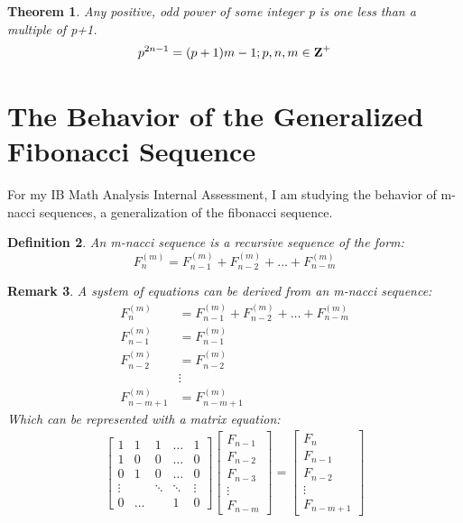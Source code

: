 \documentclass[11pt]{article}
\newtheorem{theorem}{Theorem}[section]
\newtheorem{definition}[theorem]{Definition}
\newtheorem{remark}[theorem]{Remark}
\begin{document}
\begin{theorem}
    Any positive, odd power of some integer \mbox{p} is one less than a multiple of \mbox{p+1}. 
    $$p^{2n-1}=(p+1)m-1;p,n,m\in\mbox{\textbf{Z}}^+$$
\end{theorem}

\section{The Behavior of the Generalized Fibonacci Sequence}

For my IB Math Analysis Internal Assessment, I am studying the behavior of m-nacci sequences, a generalization of the fibonacci sequence.

\begin{definition}
An m-nacci sequence is a recursive sequence of the form:
$$F^{(m)}_n=F^{(m)}_{n-1}+F^{(m)}_{n-2}+\dots+F^{(m)}_{n-m}$$
\end{definition}

\begin{remark}
    A system of equations can be derived from an m-nacci sequence:
    \begin{align*}
        F_n^{(m)} &= F^{(m)}_{n-1}+F^{(m)}_{n-2}+\dots+F^{(m)}_{n-m} \\ 
        F_{n-1}^{(m)} &= F_{n-1}^{(m)} \\ 
        F_{n-2}^{(m)} &= F_{n-2}^{(m)} \\
        &\vdots \\ 
        F_{n-m+1}^{(m)} &= F_{n-m+1}^{(m)}
    \end{align*}
    Which can be represented with a matrix equation:
    \begin{align*}
        \begin{bmatrix} 
            1 & 1 & 1 & \dots & 1 \\
            1 & 0 & 0 & \dots & 0 \\
            0 & 1 & 0 & \dots & 0 \\
            \vdots & & \ddots & \ddots  & \vdots \\ 
            0 & \dots & & 1 & 0
        \end{bmatrix}
        \begin{bmatrix} 
            F_{n-1} \\
            F_{n-2} \\
            F_{n-3} \\
            \vdots \\ 
            F_{n-m}
        \end{bmatrix} = 
        \begin{bmatrix} 
            F_{n} \\
            F_{n-1} \\
            F_{n-2} \\
            \vdots \\ 
            F_{n-m+1}
        \end{bmatrix}
    \end{align*}
\end{remark}
\end{document}
